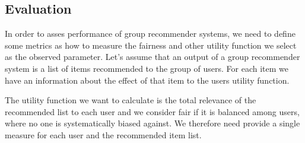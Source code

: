 \begin{itemize}
    
\end{itemize}

\subsection{Evaluation} \label{sec:02_evaluation}

In order to asses performance of group recommender systems, we need to define some metrics as how to measure the fairness and other utility function we select as the observed parameter.
Let's assume that an output of a group recommender system is a list of items recommended to the group of users. For each item we have an information about the effect of that item to the users utility function.

The utility function we want to calculate is the total relevance of the recommended list to each user and we consider fair if it is balanced among users, where no one is systematically biased against. We therefore need provide a single measure for each user and the recommended item list.

